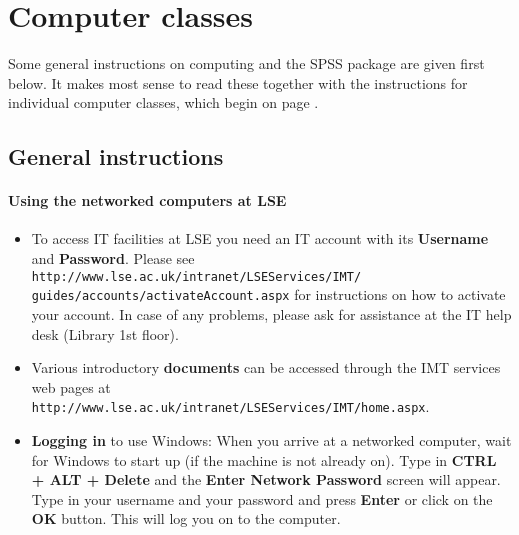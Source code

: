 \backmatter


\renewcommand{\chaptername}{\hspace*{-1em}}
\renewcommand{\thechapter}{\hspace*{-1em}}
\renewcommand{\thesection}{\hspace*{-1em}}
\renewcommand{\thesubsection}{\hspace*{-1em}}
\renewcommand{\chaptermark}[1]{\markboth{\MakeUppercase{#1}}{}}
\renewcommand{\sectionmark}[1]{\markright{\MakeUppercase{#1}}}
\renewcommand{\thetable}{A.\arabic{table}}

\chapter{Computer classes}
\label{c_class0}

\setcounter{section}{-1}

Some general instructions on computing and the SPSS package are given
first below. It makes most sense to read these together with the
instructions for individual computer classes, which begin on page
\pageref{p_class1}.

\section{General instructions}

\subsubsection{Using the networked computers at LSE}


\begin{itemize}
\item
To access IT facilities at LSE you need an IT account with its
\textbf{Username} and \textbf{Password}. Please see
\texttt{
http://www.lse.ac.uk/intranet/LSEServices/IMT/}\\\texttt{guides/accounts/activateAccount.aspx}
for instructions on how to activate your account. In case of any
problems, please ask for assistance at the IT help desk (Library 1st
floor).
\item
Various introductory \textbf{documents}
can be accessed through the IMT services web pages at
\texttt{http://www.lse.ac.uk/intranet/LSEServices/IMT/home.aspx}.
\item
\textbf{Logging in} to use Windows:
When you arrive at a networked computer, wait for Windows to start up
(if the machine is not already on). Type in \textbf{CTRL + ALT + Delete} and
the \textbf{Enter Network Password} screen will appear. Type in your
username and your password and press \textbf{Enter} or click on the
\textbf{OK} button. This will log you on to the computer.
\end{itemize}


